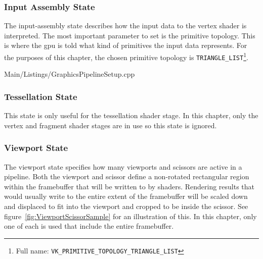       \subsubsection{Input Assembly State}
        The input-assembly state describes how the input data to the vertex shader is interpreted.
        The most important parameter to set is the primitive topology.
        This is where the \gls{gpu} is told what kind of primitives the input data represents.
        For the purposes of this chapter, the chosen primitive topology is \lstinline{TRIANGLE_LIST}\footnote{Full name: \lstinline{VK_PRIMITIVE_TOPOLOGY_TRIANGLE_LIST}}.

        
        {Main/Listings/GraphicsPipelineSetup.cpp}

      \subsubsection{Tessellation State}
        This state is only useful for the tessellation shader stage.
        In this chapter, only the vertex and fragment shader stages are in use so this state is ignored.

      \subsubsection{Viewport State}
        \label{sss:ViewportState}
        The viewport state specifies how many viewports and scissors are active in a pipeline.
        Both the viewport and scissor define a non-rotated rectangular region within the framebuffer that will be written to by shaders.
        Rendering results that would usually write to the entire extent of the framebuffer will be scaled down and displaced to fit into the viewport and cropped to be inside the scissor.
        See figure~\ref{fig:ViewportScissorSample} for an illustration of this.
        In this chapter, only one of each is used that include the entire framebuffer.


